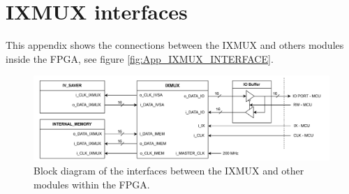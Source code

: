 \chapter{IXMUX interfaces} \label{App:IXMUX_INTERFACE}
This appendix shows the connections between the IXMUX and others modules inside the FPGA, see figure \ref{fig:App_IXMUX_INTERFACE}.

\begin{figure}[H]
    \centering
    \includegraphics[clip, trim=0 0 0 0,width=1.0\textwidth]{Appendix/Figures/IXMUX.pdf}
    \caption{Block diagram of the interfaces between the IXMUX and other modules within the FPGA.}
    \label{fig_App_IXMUX_INTERFACE}
\end{figure}

